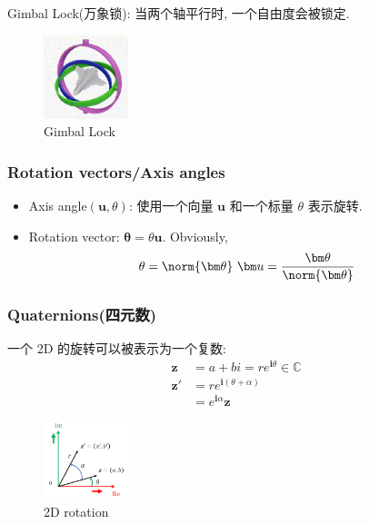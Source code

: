 Gimbal Lock(万象锁): 当两个轴平行时, 一个自由度会被锁定.
\begin{figure}[!htb]
    \centering
    \includegraphics[width=0.22\textwidth]{pic/1052/Gimbal Lock}
    \caption{Gimbal Lock}
\end{figure}


\subsubsection{Rotation vectors/Axis angles}
\begin{itemize}
    \item Axis angle$(\bm u, \theta)$: 使用一个向量 $\bm u$ 和一个标量 $\theta$ 表示旋转.
    \item Rotation vector: $\bm \theta = \theta \bm u$. Obviously,
    \begin{align*}
        \theta = \norm{\bm \theta}\ \bm u = \frac{\bm \theta}{\norm{\bm \theta}}
    \end{align*}
\end{itemize}


\subsubsection{Quaternions(四元数)}
一个 2D 的旋转可以被表示为一个复数:
\begin{align*}
    \bm z &= a+bi = re^{\bm i \theta} \in\mathbb{C}\\
    \bm z'&= re^{\bm i (\theta + \alpha)}\\
    &=e^{\bm i \alpha}\bm z
\end{align*}

\begin{figure}[!htb]
    \centering
    \includegraphics[width=0.22\textwidth]{pic/1052/2D rotation}
    \caption{2D rotation}
\end{figure}

